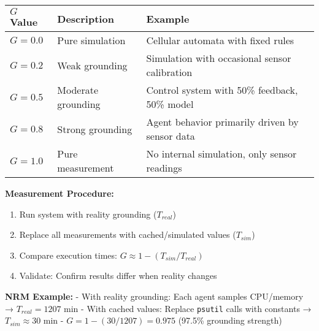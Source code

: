 \documentclass[
]{article}
\newcounter{none} %
\providecommand{\tightlist}{%
  \setlength{\itemsep}{0pt}\setlength{\parskip}{0pt}}
\begin{document}
{\def\LTcaptype{none} %
\begin{longtable}[]{@{}
  >{\raggedright\arraybackslash}p{}
  >{\raggedright\arraybackslash}p{}
  >{\raggedright\arraybackslash}p{}@{}}
\toprule\noalign{}
\begin{minipage}[b]{\linewidth}\raggedright
\(G\) Value
\end{minipage} & \begin{minipage}[b]{\linewidth}\raggedright
Description
\end{minipage} & \begin{minipage}[b]{\linewidth}\raggedright
Example
\end{minipage} \\
\midrule\noalign{}
\endhead
\bottomrule\noalign{}
\endlastfoot
\(G = 0.0\) & Pure simulation & Cellular automata with fixed rules \\
\(G = 0.2\) & Weak grounding & Simulation with occasional sensor
calibration \\
\(G = 0.5\) & Moderate grounding & Control system with 50\% feedback,
50\% model \\
\(G = 0.8\) & Strong grounding & Agent behavior primarily driven by
sensor data \\
\(G = 1.0\) & Pure measurement & No internal simulation, only sensor
readings \\
\end{longtable}
}

\textbf{Measurement Procedure:}

\begin{enumerate}
\def\labelenumi{\arabic{enumi}.}
\tightlist
\item
  Run system with reality grounding (\(T_{real}\))
\item
  Replace all measurements with cached/simulated values (\(T_{sim}\))
\item
  Compare execution times: \(G \approx 1 - (T_{sim} / T_{real})\)
\item
  Validate: Confirm results differ when reality changes
\end{enumerate}

\textbf{NRM Example:} - With reality grounding: Each agent samples
CPU/memory → \(T_{real} = 1207\) min - With cached values: Replace
\texttt{psutil} calls with constants → \(T_{sim} \approx 30\) min -
\(G = 1 - (30/1207) = 0.975\) (97.5\% grounding strength)
\end{document}
